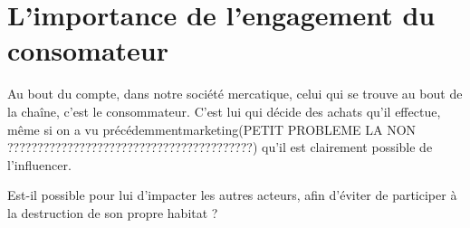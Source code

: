 \section{L'importance de l'engagement du consomateur}

\smallbreak Au bout du compte, dans notre société mercatique, celui qui se trouve au bout de la chaîne, c'est le consommateur.
C'est lui qui décide des achats qu'il effectue, même si on a vu précédemment{marketing}(PETIT PROBLEME LA NON ?????????????????????????????????????????) qu'il est clairement possible de l'influencer.

Est-il possible pour lui d'impacter les autres acteurs, afin d'éviter de participer à la destruction de son propre habitat ?
